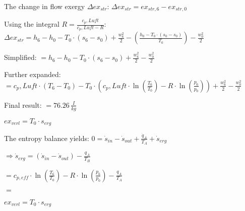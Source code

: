 The change in flow exergy \( \Delta ex_{str} \):  
\( \Delta ex_{str} = ex_{str,6} - ex_{str,0} \)  

Using the integral \( R = \frac{c_p, Luft}{c_p, Luft - R} \):  
\( \Delta ex_{str} = h_6 - h_0 - T_0 \cdot (s_6 - s_0) + \frac{w_6^2}{2} - \left( \frac{h_0 - T_0 \cdot (s_0 - s_0)}{T_0} \right) - \frac{w_0^2}{2} \)  

Simplified:  
\( = h_6 - h_0 - T_0 \cdot (s_6 - s_0) + \frac{w_6^2}{2} - \frac{w_0^2}{2} \)  

Further expanded:  
\( = c_p, Luft \cdot (T_6 - T_0) - T_0 \cdot (c_p, Luft \cdot \ln \left( \frac{T_6}{T_0} \right) - R \cdot \ln \left( \frac{p_6}{p_0} \right)) + \frac{w_6^2}{2} - \frac{w_0^2}{2} \)  

Final result:  
\( = 76.26 \, \frac{I}{kg} \)

\( ex_{verl} = T_0 \cdot s_{erg} \)  

The entropy balance yields:  
\( 0 = \dot{s}_{in} - \dot{s}_{out} + \frac{\dot{q}_A}{T_A} + \dot{s}_{erg} \)  

\( \Rightarrow \dot{s}_{erg} = (\dot{s}_{in} - \dot{s}_{out}) - \frac{q_A}{T_B} \)  

\( = c_{p,eff} \cdot \ln \left( \frac{T_6}{T_0} \right) - R \cdot \ln \left( \frac{p_6}{p_0} \right) - \frac{q_A}{T_A} \)  

\( = \)  

\( ex_{verl} = T_0 \cdot s_{erg} \)